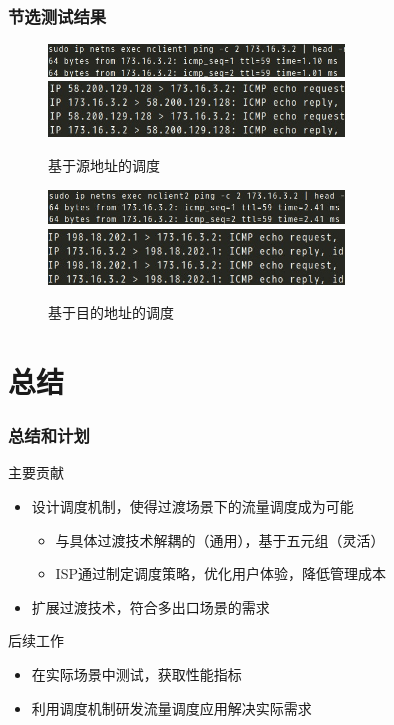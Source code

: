 \documentclass{beamer}
\begin{document}
\begin{frame}
  \frametitle{节选测试结果}

  \begin{figure}
    \includegraphics[width=0.7\textwidth]{figs/c1-s4-ping.jpeg}\\
    \includegraphics[width=0.7\textwidth]{figs/c1-s4-pdump.jpeg}
    \caption{\tiny 基于源地址的调度}
  \end{figure}

  \vspace{-1em}

  \begin{figure}
    \includegraphics[width=0.7\textwidth]{figs/c2-s4-ping.jpeg}\\
    \includegraphics[width=0.7\textwidth]{figs/c2-s4-pdump.jpeg}
    \caption{\tiny 基于目的地址的调度}
  \end{figure}
\end{frame}

\section{总结}
\begin{frame}
  \frametitle{总结和计划}

  \begin{block}{主要贡献}
    \begin{itemize}
    \item 设计调度机制，使得过渡场景下的流量调度成为可能
      \begin{itemize}
      \item 与具体过渡技术解耦的（通用），基于五元组（灵活）
      \item ISP通过制定调度策略，优化用户体验，降低管理成本
      \end{itemize}
    \item 扩展过渡技术，符合多出口场景的需求
    \end{itemize}
  \end{block}

  \begin{block}{后续工作}
    \begin{itemize}
    \item 在实际场景中测试，获取性能指标
    \item 利用调度机制研发流量调度应用解决实际需求
    \end{itemize}
  \end{block}
\end{frame}
\end{document}

